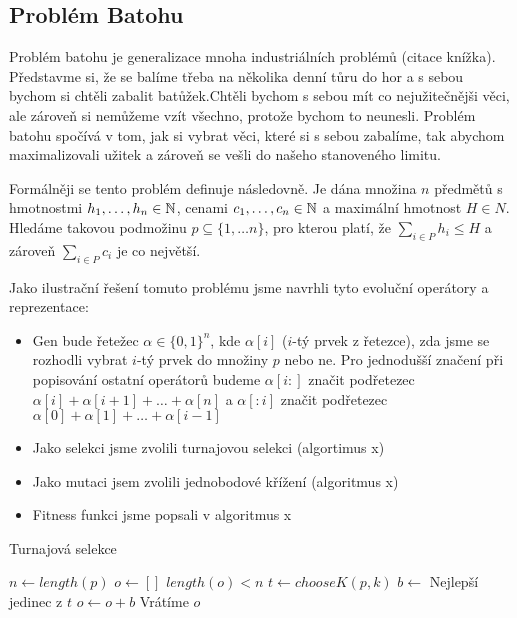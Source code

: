 \subsection{Problém Batohu}

Problém batohu je generalizace mnoha industriálních problémů (citace knížka). Představme si, že se balíme třeba na několika denní tůru do hor a s sebou bychom si chtěli zabalit batůžek.Chtěli bychom s sebou mít co nejužitečnějši věci, ale zároveň si nemůžeme vzít všechno, protože bychom to neunesli. Problém batohu spočívá v tom, jak si vybrat věci, které si s sebou zabalíme, tak abychom maximalizovali užitek a zároveň se vešli do našeho stanoveného limitu.

Formálněji se tento problém definuje následovně. Je dána množina $n$ předmětů s hmotnostmi $h_1, \dots, h_n \in \mathbb{N}$, cenami $c_1, \dots, c_n \in \mathbb{N}$ a maximální hmotnost $H \in N$. Hledáme takovou podmožinu $p \subseteq \{1, \dots n\}$, pro kterou platí, že $\sum_{i \in P} h_i \leq H$ a zároveň $\sum_{i \in P} c_i$ je co největší.

Jako ilustrační řešení tomuto problému jsme navrhli tyto evoluční operátory a reprezentace:
\begin{itemize}
    \item Gen bude řetežec $\alpha \in \{0,1\}^n$, kde $\alpha[i]$ ($i$-tý prvek z řetezce), zda jsme se rozhodli vybrat $i$-tý prvek do množiny $p$ nebo ne. Pro jednodušší značení při popisování ostatní operátorů budeme $\alpha[i:]$ značit podřetezec $\alpha[i] + \alpha[i+1] + \dots + \alpha[n]$ a $\alpha[:i]$ značit podřetezec $\alpha[0] + \alpha[1] + \dots + \alpha[i-1]$ 
    \item Jako selekci jsme zvolili turnajovou selekci (algortimus x) 
    \item Jako mutaci jsem zvolili jednobodové křížení (algoritmus x)
    \item Fitness funkci jsme popsali v algoritmus x
\end{itemize}

\begin{algorithm}
\caption{Turnajová selekce}
\begin{algorithmic}[1]  %
    \State $n \gets length(p)$ 
    \State $o \gets []$
    \While $length(o) < n$
        \State $t \gets chooseK(p, k)$ 
        \State $b \gets$ Nejlepší jedinec z $t$
        \State $o \gets o + b$
    \EndWhile
    \State Vrátíme $o$
\EndFunction
\end{algorithmic}
\end{algorithm}

